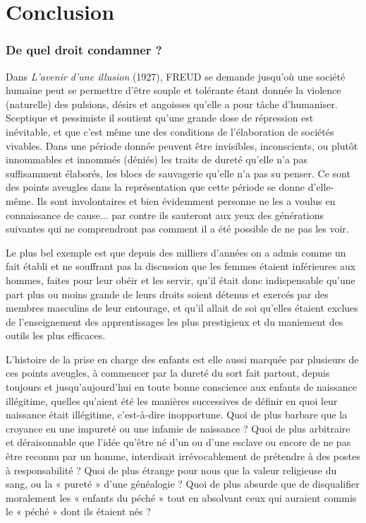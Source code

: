 
\part{Conclusion}




  \section{De quel droit condamner ?} 
 
 Dans \emph{L'avenir d'une illusion} (1927), FREUD se demande jusqu'où une société humaine peut se permettre d'être souple et tolérante étant donnée la violence (naturelle) des pulsions, désirs et angoisses qu'elle a pour tâche d'humaniser. Sceptique et pessimiste il soutient qu'une grande dose de répression est inévitable, et que c'est même une des conditions de l'élaboration de sociétés vivables. Dans une période donnée peuvent être invisibles, inconscients, ou plutôt innommables et innommés (déniés) les traits de dureté qu'elle n'a pas suffisamment élaborés, les blocs de sauvagerie qu'elle n'a pas su penser. Ce sont des points aveugles dans la représentation que cette période se donne d'elle-même. Ils sont involontaires et bien évidemment personne ne les a voulus en connaissance de cause... par contre ils sauteront aux yeux des générations suivantes qui ne comprendront pas comment il a été possible de ne pas les voir. 
 
 Le plus bel exemple est que depuis des milliers d'années on a admis comme un fait établi et ne souffrant pas la discussion que les femmes étaient inférieures aux hommes, faites pour leur obéir et les servir, qu'il était donc indispensable qu'une part plus ou moins grande de leurs droits soient détenus et exercés par des membres masculins de leur entourage, et qu’il allait de soi qu’elles étaient  exclues de l’enseignement des apprentissages les plus prestigieux et du maniement des outils les plus efficaces.
 
L'histoire de la prise en charge des enfants est elle aussi marquée par plusieurs de ces points aveugles, à commencer par la dureté du sort fait partout, depuis toujours et jusqu'aujourd'hui en toute bonne conscience aux enfants de naissance illégitime, quelles qu'aient été les manières successives de définir en quoi leur naissance était illégitime, c'est-à-dire inopportune. Quoi de plus barbare que la croyance en une impureté ou une infamie de naissance ? Quoi de plus arbitraire et déraisonnable que l'idée qu'être né d'un ou d'une esclave ou encore de ne pas être reconnu par un homme, interdisait irrévocablement de prétendre à des postes à responsabilité ? Quoi de plus étrange pour nous que la valeur religieuse du sang, ou la « pureté » d'une généalogie ? Quoi de plus absurde que de disqualifier moralement les « enfants du péché » tout en absolvant ceux qui auraient commis le « péché » dont ils étaient nés ? 


